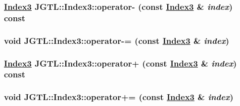 \hypertarget{class_j_g_t_l_1_1_index3_acda81612eb294b96943b7693526f6dc}{
\subsubsection[operator-]{\setlength{\rightskip}{0pt plus 5cm}\hyperlink{class_j_g_t_l_1_1_index3}{Index3} JGTL::Index3::operator- (const \hyperlink{class_j_g_t_l_1_1_index3}{Index3} \& {\em index}) const}}
\label{class_j_g_t_l_1_1_index3_acda81612eb294b96943b7693526f6dc}


\hypertarget{class_j_g_t_l_1_1_index3_c204d4d42938bd7fc41c06041ad17661}{
\subsubsection[operator-=]{\setlength{\rightskip}{0pt plus 5cm}void JGTL::Index3::operator-= (const \hyperlink{class_j_g_t_l_1_1_index3}{Index3} \& {\em index})}}
\label{class_j_g_t_l_1_1_index3_c204d4d42938bd7fc41c06041ad17661}


\hypertarget{class_j_g_t_l_1_1_index3_dc6ba4abf1475cdb42b5ea1fd5157414}{
\subsubsection[operator+]{\setlength{\rightskip}{0pt plus 5cm}\hyperlink{class_j_g_t_l_1_1_index3}{Index3} JGTL::Index3::operator+ (const \hyperlink{class_j_g_t_l_1_1_index3}{Index3} \& {\em index}) const}}
\label{class_j_g_t_l_1_1_index3_dc6ba4abf1475cdb42b5ea1fd5157414}


\hypertarget{class_j_g_t_l_1_1_index3_28b8a687460de3b981aa58e2793459e6}{
\subsubsection[operator+=]{\setlength{\rightskip}{0pt plus 5cm}void JGTL::Index3::operator+= (const \hyperlink{class_j_g_t_l_1_1_index3}{Index3} \& {\em index})}}
\label{class_j_g_t_l_1_1_index3_28b8a687460de3b981aa58e2793459e6}


